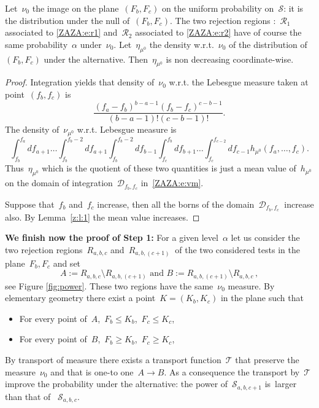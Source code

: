 \documentclass[final,numbib]{imaiai}%
\numberwithin{equation}{section}
\def\cS{\mathcal{S}}
\def\cT{\mathcal{T}}
\newcommand{\<}{\langle}
\renewcommand{\>}{\rangle}
\newcommand{\1}{\mathds{1}}
\begin{document}
{ \begin{lemma} \label{jma:lemma}  Let~$\nu_0$  the image  on the plane~$(F_b,F_c)$  on the uniform probability  on~$\mathcal S$: it is the distribution  under the null of~$(F_b,F_c)$. The two rejection regions :~$\mathcal R_1$ associated to 
\eqref{ZAZA:e:r1} and~$\mathcal R_2$ associated to 
\eqref{ZAZA:e:r2} 
have  of course the same probability~$\alpha$ under~$\nu_0$. Let~$\eta_{\mu^0}$ the density w.r.t.~$\nu_0$ of the distribution of~$(F_b,F_c)$ under the alternative. Then~$\eta_{\mu^0}$     is non decreasing coordinate-wise. 
  \end{lemma}
  \begin{proof}  
Integration yields that density of~$\nu_0$ w.r.t. the Lebesgue    measure taken at point~$(f_b,f_c)$  is 
\[
 \frac{  (f_a-f_b)^{b-a-1}   (f_b-f_c)^{c-b-1}  }{(b-a-1)!(c-b-1)!}.
\]
  The density of~$\nu_{\mu^0}$  w.r.t. Lebesgue measure  is 
  \begin{equation}\label{ZAZA:e:vm}
  \int _{f_b} ^{f_a} df_{a+1} \ldots   \int _{f_b} ^{f_b-2} df_{a+1}  \int _{f_b} ^{f_b-2} df_{b-1} 
   \int _{f_c} ^{f_b} df_{b+1} \ldots   \int _{f_c} ^{f_{c-2}} df_{c-1}   h_{\mu^0}(f_{a},\ldots ,f_c).
 \end{equation}
  Thus~$\eta_{\mu^0}$ which is the quotient  of these two quantities is just  a mean value  of~$h_{\mu^0}$ on the domain  of integration~$\mathcal D_{f_b,f_c}$  in~\eqref{ZAZA:e:vm}.
  
  Suppose that~$f_b$ and~$ f_c$  increase, then all the borns of the domain~$\mathcal D_{f_b,f_c}~$ increase also. By Lemma~\ref{z:l:1} the mean value  increases.
\end{proof}

\medskip
   
    \noindent
     {\bf We finish now the proof of  Step 1:}  For a given level~$\alpha$ let us consider the two rejection regions~$ R_{a,b,c}$ and~$R_{a,b,(c+1)}~$  of the two considered tests in the plane~$F_b,F_c$ and set
     \[
     A:=R_{a,b,c} \setminus R_{a,b,(c+1)} \text{ and } B:= R_{a,b,(c+1)}\setminus R_{a,b,c}\,,
     \] 
     see Figure \ref{fig:power}.  These two regions have  the same~$\nu_0$ measure. By elementary geometry there exist a point~$K=(K_b,K_c)$  in the plane such that 
      \begin{itemize}
      \item For every point of~$A$,~$F_b \leq K_b$,~$F_c \leq  K_c$,
      \item For every point of~$B$,~$F_b \geq K_b$,~$F_c \geq  K_c$,
\end{itemize}
      By transport of measure there exists a transport function~$\cT$  that  preserve the measure~$\nu_0$  and  that is one-to one~$A \to B$.   As a consequence  the transport  by~$\cT$ improve the probability under the alternative: the power of~$\cS_{a,b,c+1}$ is~larger than that of 
     ~$\cS_{a,b,c}$.  \bigskip

}
\end{document}
